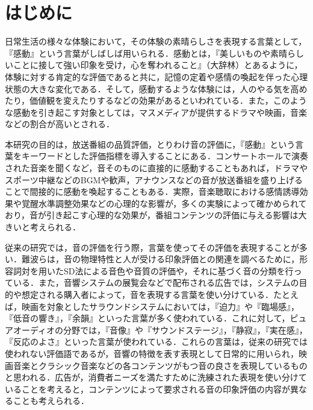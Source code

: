 \documentclass[japanese]{jnlp_1.3c}
\begin{document}
\maketitle



\section{はじめに}

日常生活の様々な体験において，その体験の素晴らしさを表現する言葉として，『感動』という言葉がしばしば用いられる．感動とは，『美しいものや素晴らしいことに接して強い印象を受け，心を奪われること』（大辞林\cite{Book_103}）とあるように，体験に対する肯定的な評価であると共に，記憶の定着や感情の喚起を伴った心理状態の大きな変化である．そして，感動するような体験には，人のやる気を高めたり，価値観を変えたりするなどの効果があるといわれている\cite{Article_007}．また，このような感動を引き起こす対象としては，マスメディアが提供するドラマや映画，音楽などの割合が高いとされる\cite{Web_401}．

本研究の目的は，放送番組の品質評価，とりわけ音の評価に，『感動』という言葉をキーワードとした評価指標を導入することにある．コンサートホールで演奏された音楽を聞くなど，音そのものに直接的に感動することもあれば，ドラマやスポーツ中継などのBGMや歓声，アナウンスなどの音が放送番組を盛り上げることで間接的に感動を喚起することもある．実際，音楽聴取における感情誘導効果や覚醒水準調整効果などの心理的な影響が，多くの実験によって確かめられており\cite{Book_101}，音が引き起こす心理的な効果が，番組コンテンツの評価に与える影響は大きいと考えられる．


従来の研究では，音の評価を行う際，言葉を使ってその評価を表現することが多い．難波ら\cite{Book_105}は，音の物理特性と人が受ける印象評価との関連を調べるために，形容詞対を用いたSD法による音色や音質の評価や，それに基づく音の分類を行っている．また，音響システムの展覧会などで配布される広告では，システムの目的や想定される購入者によって，音を表現する言葉を使い分けている．たとえば，映画を対象としたサラウンドシステムにおいては，『迫力』や『臨場感』，『低音の響き』，『余韻』といった言葉が多く使われている．これに対して，ピュアオーディオの分野では，『音像』や『サウンドステージ』，『静寂』，『実在感』，『反応のよさ』といった言葉が使われている．これらの言葉は，従来の研究では使われない評価語であるが，音響の特徴を表す表現として日常的に用いられ，映画音楽とクラシック音楽などの各コンテンツがもつ音の良さを表現しているものと思われる．広告が，消費者ニーズを満たすために洗練された表現を使い分けていることを考えると，コンテンツによって要求される音の印象評価の内容が異なることも考えられる．
\end{document}
